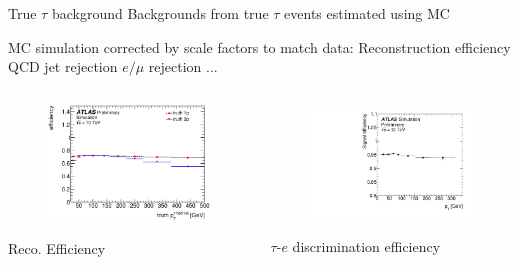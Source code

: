\documentclass[10pt]{beamer}
\begin{document}
\begin{frame}{True $\tau$ background}
\centering
{\large\color{blue} Backgrounds from true $\tau$ events estimated using MC}
%
\begin{outline}
\1 MC simulation corrected by scale factors to match data:
	\2 Reconstruction efficiency 
	\2 QCD jet rejection 
	\2 $e/\mu$ rejection 
	\2 ...  
\end{outline}
\begin{columns}
	\begin{column}{0.5\linewidth}
\begin{figure}
  \includegraphics[width=\textwidth]{figures/tau_reco_eff.eps} 
\end{figure}
\vspace*{-\baselineskip}
\centering
Reco. Efficiency
	\end{column}
	\begin{column}{0.5\linewidth}
\begin{figure}
  \includegraphics[width=\textwidth]{figures/tau_ele_eff.pdf}
\end{figure}
\vspace*{-\baselineskip}
\centering
$\tau$-$e$ discrimination efficiency
	\end{column}
\end{columns}
\end{frame}
\end{document}
